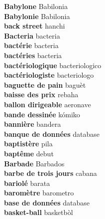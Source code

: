 \textbf{ Babylone  } Babilonia \\
\textbf{ Babylonie  } Babilonia \\
\textbf{ back street  } hanchi \\
\textbf{ Bacteria  } bacteria \\
\textbf{ bactérie  } bacteria \\
\textbf{ bactéries  } bacteria \\
\textbf{ bactériologique  } bacteriologico \\
\textbf{ bactériologiste  } bacteriologo \\
\textbf{ baguette de pain  } baguèt \\
\textbf{ baisse des prix  } rebaha \\
\textbf{ ballon dirigeable  } aeronave \\
\textbf{ bande dessinée  } kómiko \\
\textbf{ bannière  } bandera \\
\textbf{ banque de données  } database \\
\textbf{ baptistère  } pila \\
\textbf{ baptême  } debut \\
\textbf{ Barbade  } Barbados \\
\textbf{ barbe de trois jours  } cabana \\
\textbf{ bariolé  } barata \\
\textbf{ baromètre  } barometro \\
\textbf{ base de données  } database \\
\textbf{ basket-ball  } basketbòl \\
